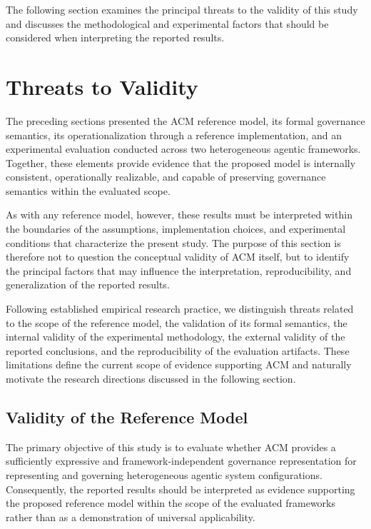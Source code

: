 \documentclass[10pt]{article}
\begin{document}
The following section examines the principal threats to the validity of this study and discusses the methodological and experimental factors that should be considered when interpreting the reported results.

\section{Threats to Validity}
\label{sec:threats_validity}

The preceding sections presented the ACM reference model, its formal governance semantics, its operationalization through a reference implementation, and an experimental evaluation conducted across two heterogeneous agentic frameworks. Together, these elements provide evidence that the proposed model is internally consistent, operationally realizable, and capable of preserving governance semantics within the evaluated scope.

As with any reference model, however, these results must be interpreted within the boundaries of the assumptions, implementation choices, and experimental conditions that characterize the present study. The purpose of this section is therefore not to question the conceptual validity of ACM itself, but to identify the principal factors that may influence the interpretation, reproducibility, and generalization of the reported results.

Following established empirical research practice, we distinguish threats related to the scope of the reference model, the validation of its formal semantics, the internal validity of the experimental methodology, the external validity of the reported conclusions, and the reproducibility of the evaluation artifacts. These limitations define the current scope of evidence supporting ACM and naturally motivate the research directions discussed in the following section.

\subsection{Validity of the Reference Model}
\label{sec:validity_reference_model}

The primary objective of this study is to evaluate whether ACM provides a sufficiently expressive and framework-independent governance representation for representing and governing heterogeneous agentic system configurations. Consequently, the reported results should be interpreted as evidence supporting the proposed reference model within the scope of the evaluated frameworks rather than as a demonstration of universal applicability.
\end{document}
